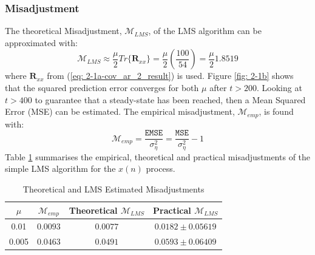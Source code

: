 \documentclass[12pt]{article}
\numberwithin{equation}{section}
\begin{document}
		\subsubsection{Misadjustment}
			
			The theoretical Misadjustment, $\mathcal{M}_{LMS}$, of the LMS algorithm can be approximated with:
			\vspace*{-0.4\baselineskip}
			\begin{equation}
			\mathcal{M}_{LMS} \approx \frac{\mu}{2} Tr\big\{ \mathbf{R}_{xx} \big\} = \frac{\mu}{2} \left(\frac{100}{54}\right) = \frac{\mu}{2} 1.8519
			\end{equation}
			\indent
			where $\mathbf{R}_{xx}$ from (\ref{eq: 2-1a-cov_ar_2_result}) is used. \newline
			\noindent
			Figure \ref{fig: 2-1b} shows that the squared prediction error converges for both $\mu$ after $t > 200$. Looking at $t > 400$ to guarantee that a steady-state has been reached, then a Mean Squared Error (MSE) can be estimated. The empirical misadjustment, $\mathcal{M}_{emp}$, is found with:
			\begin{equation}
			\mathcal{M}_{emp} = \frac{\mathtt{EMSE}}{\sigma_{\eta}^{2}} = \frac{\mathtt{MSE}}{\sigma_{\eta}^{2}} -1
			\end{equation}
			\noindent
			Table \ref{tab: 2-1c} summarises the empirical, theoretical and practical misadjustments of the simple LMS algorithm for the $x(n)$ process.
						
			\begin{table}[H]
				\centering
				\begin{tabular}{|c|c|c||c|}
					\hline
					\textbf{$\mu$} & \textbf{$\mathcal{M}_{emp}$} & Theoretical \textbf{$\mathcal{M}_{LMS}$} & Practical \textbf{$\mathcal{M}_{LMS}$} \\
					\hline
					0.01 & $0.0093$ & $0.0077$ & $0.0182 \pm 0.05619$ \\
					\hline
					0.005 & $0.0463$ & $0.0491$ & $0.0593 \pm 0.06409$ \\
					\hline
				\end{tabular}
				\captionsetup{justification=centering}
				\caption{Theoretical and LMS Estimated Misadjustments}
				\label{tab: 2-1c}
			\end{table}
		
\end{document}
